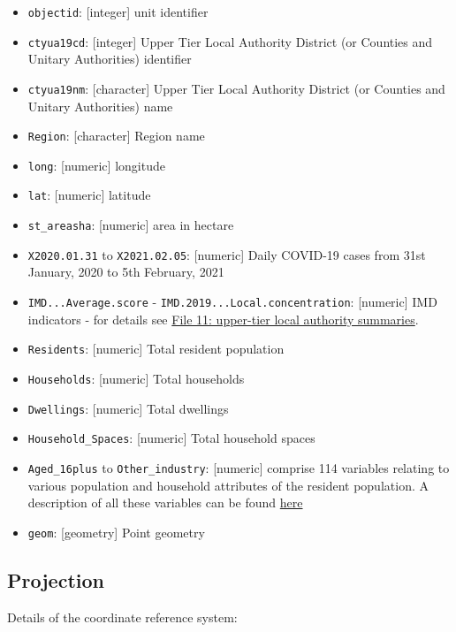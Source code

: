 \documentclass[
  letterpaper,
  DIV=11,
  numbers=noendperiod,
  oneside]{scrreprt}
\providecommand{\tightlist}{%
  \setlength{\itemsep}{0pt}\setlength{\parskip}{0pt}}\usepackage{longtable,booktabs,array}
\begin{document}
\begin{itemize}
\tightlist
\item
  \texttt{objectid}: {[}integer{]} unit identifier
\item
  \texttt{ctyua19cd}: {[}integer{]} Upper Tier Local Authority District
  (or Counties and Unitary Authorities) identifier
\item
  \texttt{ctyua19nm}: {[}character{]} Upper Tier Local Authority
  District (or Counties and Unitary Authorities) name
\item
  \texttt{Region}: {[}character{]} Region name
\item
  \texttt{long}: {[}numeric{]} longitude
\item
  \texttt{lat}: {[}numeric{]} latitude
\item
  \texttt{st\_areasha}: {[}numeric{]} area in hectare
\item
  \texttt{X2020.01.31} to \texttt{X2021.02.05}: {[}numeric{]} Daily
  COVID-19 cases from 31st January, 2020 to 5th February, 2021
\item
  \texttt{IMD...Average.score} -
  \texttt{IMD.2019...Local.concentration}: {[}numeric{]} IMD indicators
  - for details see
  \href{https://www.gov.uk/government/statistics/english-indices-of-deprivation-2019}{File
  11: upper-tier local authority summaries}.
\item
  \texttt{Residents}: {[}numeric{]} Total resident population
\item
  \texttt{Households}: {[}numeric{]} Total households
\item
  \texttt{Dwellings}: {[}numeric{]} Total dwellings
\item
  \texttt{Household\_Spaces}: {[}numeric{]} Total household spaces
\item
  \texttt{Aged\_16plus} to \texttt{Other\_industry}: {[}numeric{]}
  comprise 114 variables relating to various population and household
  attributes of the resident population. A description of all these
  variables can be found
  \href{data/assignment_2_covid/census_vars.csv}{here}
\item
  \texttt{geom}: {[}geometry{]} Point geometry
\end{itemize}

\subsection*{Projection}\label{projection-1}

Details of the coordinate reference system:
\end{document}

